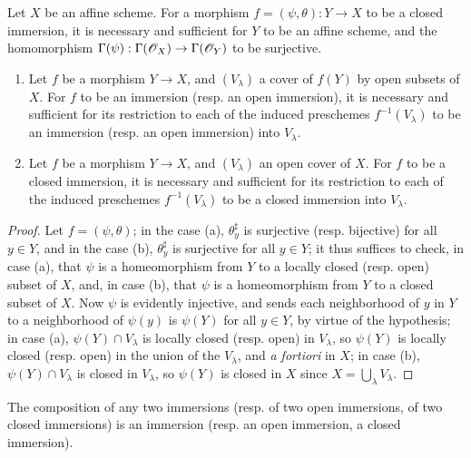 \begin{cor}[4.2.3]
\label{1.4.2.3}
Let $X$ be an affine scheme.
For a morphism $f=(\psi,\theta):Y\to X$ to be a closed immersion, it is necessary and sufficient for $Y$ to be an affine scheme, and the homomorphism $\Gamma(\psi):\Gamma(\OO_X)\to\Gamma(\OO_Y)$ to be surjective.
\end{cor}

\begin{cor}[4.2.4]
\label{1.4.2.4}
\medskip\noindent
\begin{enumerate}[label={\rm(\alph*)}]
  \item Let $f$ be a morphism $Y\to X$, and $(V_\lambda)$ a cover of $f(Y)$ by open subsets of $X$.
    For $f$ to be an immersion (resp. an open immersion), it is necessary and sufficient
    for its restriction to each of the induced preschemes $f^{-1}(V_\lambda)$ to be an immersion (resp. an open immersion) into $V_\lambda$.
  \item Let $f$ be a morphism $Y\to X$, and $(V_\lambda)$ an open cover of $X$.
    For $f$ to be a closed immersion, it is necessary and sufficient for its restriction to each of the induced preschemes $f^{-1}(V_\lambda)$ to be a closed immersion into $V_\lambda$.
\end{enumerate}
\end{cor}

\begin{proof}
\label{proof-1.4.2.4}
Let $f=(\psi,\theta)$;
in the case (a), $\theta_y^\sharp$ is surjective (resp. bijective) for all $y\in Y$, and in the case (b), $\theta_y^\sharp$ is surjective for all $y\in Y$;
it thus suffices to check, in case (a), that $\psi$ is a homeomorphism from $Y$ to a locally closed (resp. open) subset of $X$, and, in case (b), that $\psi$ is a homeomorphism from $Y$ to a closed subset of $X$.
Now $\psi$ is evidently injective, and sends each neighborhood of $y$ in $Y$ to a neighborhood of $\psi(y)$ is $\psi(Y)$ for all $y\in Y$, by virtue of the hypothesis;
in case (a), $\psi(Y)\cap V_\lambda$ is locally closed (resp. open) in $V_\lambda$, so $\psi(Y)$ is locally closed (resp. open) in the union of the $V_\lambda$, and \emph{a fortiori} in $X$;
in case (b), $\psi(Y)\cap V_\lambda$ is closed in $V_\lambda$, so $\psi(Y)$ is closed in $X$ since $X=\bigcup_\lambda V_\lambda$.
\end{proof}

\begin{prop}[4.2.5]
\label{1.4.2.5}
The composition of any two immersions (resp. of two open immersions, of two closed immersions) is an immersion (resp. an open immersion, a closed immersion).
\end{prop}

